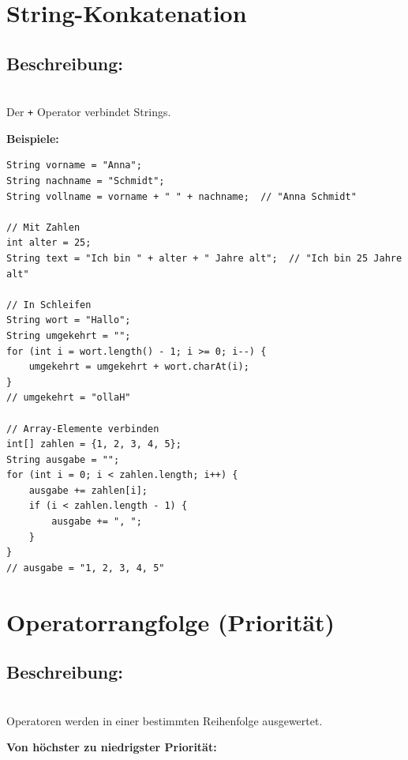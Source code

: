 \newpage


\section*{String-Konkatenation}

\subsection*{Beschreibung:}\\
Der \texttt{+} Operator verbindet Strings.

\textbf{Beispiele:}
\begin{lstlisting}
String vorname = "Anna";
String nachname = "Schmidt";
String vollname = vorname + " " + nachname;  // "Anna Schmidt"

// Mit Zahlen
int alter = 25;
String text = "Ich bin " + alter + " Jahre alt";  // "Ich bin 25 Jahre alt"

// In Schleifen
String wort = "Hallo";
String umgekehrt = "";
for (int i = wort.length() - 1; i >= 0; i--) {
    umgekehrt = umgekehrt + wort.charAt(i);
}
// umgekehrt = "ollaH"

// Array-Elemente verbinden
int[] zahlen = {1, 2, 3, 4, 5};
String ausgabe = "";
for (int i = 0; i < zahlen.length; i++) {
    ausgabe += zahlen[i];
    if (i < zahlen.length - 1) {
        ausgabe += ", ";
    }
}
// ausgabe = "1, 2, 3, 4, 5"
\end{lstlisting}

\newpage


\section*{Operatorrangfolge (Priorität)}

\subsection*{Beschreibung:}\\
Operatoren werden in einer bestimmten Reihenfolge ausgewertet.

\textbf{Von höchster zu niedrigster Priorität:}


